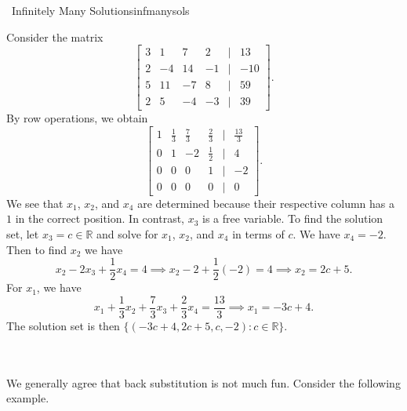         \begin{example}{\Difficulty\,\Difficulty\,\,Infinitely Many Solutions}{infmanysols}
            
            Consider the matrix
            \begin{equation*}
                \begin{bmatrix} 
                3 & 1 & 7 & 2 & | & 13 \\
                2 & -4 & 14 & -1 & | & -10 \\
                5 & 11 & -7 & 8 & | & 59 \\
                2 & 5 & -4 & -3 & | & 39
                \end{bmatrix}.
            \end{equation*}
            By row operations, we obtain
            \begin{equation*}
                \begin{bmatrix} 
                1 & \frac{1}{3} & \frac{7}{3} & \frac{2}{3} & | & \frac{13}{3} \\
                0 & 1 & -2 & \frac{1}{2} & | & 4 \\
                0 & 0 & 0 & 1 & | & -2 \\
                0 & 0 & 0 & 0 & | & 0
                \end{bmatrix}.
            \end{equation*}
            We see that \(x_1\), \(x_2\), and \(x_4\) are determined because their respective column has a \(1\) in the correct position. In contrast, \(x_3\) is a free variable. To find the solution set, let \(x_3=c\in\mathbb{R}\) and solve for \(x_1\), \(x_2\), and \(x_4\) in terms of \(c\). We have \(x_4=-2\). Then to find \(x_2\) we have
            \begin{equation*}
                x_2-2x_3+\frac{1}{2}x_4=4\implies x_2-2+\frac{1}{2}(-2)=4\implies x_2=2c+5.
            \end{equation*}
            For \(x_1\), we have
            \begin{equation*}
                x_1+\frac{1}{3}x_2+\frac{7}{3}x_3+\frac{2}{3}x_4=\frac{13}{3}\implies x_1=-3c+4.
            \end{equation*}
            The solution set is then \(\{(-3c+4,2c+5,c,-2):c\in\mathbb{R}\}\).
        \end{example}
        \vphantom
        \\
        \\
        We generally agree that back substitution is not much fun. Consider the following example.
